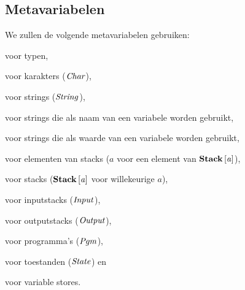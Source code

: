 \subsection{Metavariabelen}
\label{sec:def:meta}
We zullen de volgende metavariabelen gebruiken:

\begin{description}[labelindent=\parindent]
	\item[$a$] voor typen,
	\item[$c$] voor karakters ($\mathit{Char}$),
	\item[$s$] voor strings ($\mathit{String}$),
	\item[$\var$] voor strings die als naam van een variabele worden gebruikt,
	\item[$\val$] voor strings die als waarde van een variabele worden gebruikt,
	\item[$e$] voor elementen van stacks ($a$ voor een element van $\mathbf{Stack}\left[\mathit{a}\right]$),
	\item[$\stk$] voor stacks ($\mathbf{Stack}\left[\mathit{a}\right]$ voor willekeurige $a$),
	\item[$\ip$] voor inputstacks ($\mathit{Input}$),
	\item[$\op$] voor outputstacks ($\mathit{Output}$),
	\item[$\pgm$] voor programma's ($\mathit{Pgm}$),
	\item[$\st$] voor toestanden ($\mathit{State}$) en
	\item[$\str$] voor variable stores.
\end{description}

